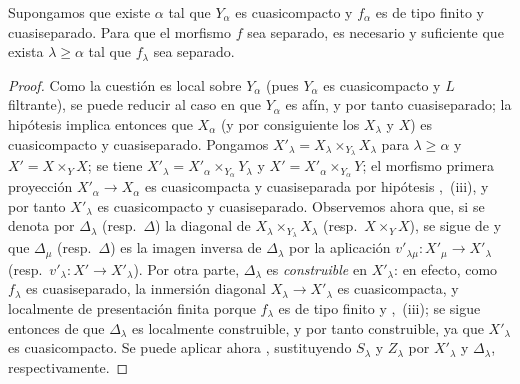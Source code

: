 \begin{proposition}[8.10.4]
\label{IV.8.10.4-fr}
Supongamos que existe $\alpha$ tal que $Y_\alpha$ es cuasicompacto y $f_\alpha$ es de tipo finito y cuasiseparado.
Para que el morfismo $f$ sea separado, es necesario y suficiente que exista $\lambda\geq\alpha$ tal que $f_\lambda$ sea separado.
\end{proposition}

\begin{proof}
Como la cuestión es local sobre $Y_\alpha$ (pues $Y_\alpha$ es cuasicompacto y $L$ filtrante), se puede reducir al caso en que $Y_\alpha$ es afín, y por tanto cuasiseparado; la hipótesis implica entonces que $X_\alpha$ (y por consiguiente los $X_\lambda$ y $X$) es cuasicompacto y cuasiseparado.
Pongamos $X'_\lambda=X_\lambda\times_{Y_\lambda}X_\lambda$ para $\lambda\geq\alpha$ y $X'=X\times_YX$; se tiene $X'_\lambda=X'_\alpha\times_{Y_\alpha}Y_\lambda$ y $X'=X'_\alpha\times_{Y_\alpha}Y$; el morfismo primera proyección $X'_\alpha\to X_\alpha$ es cuasicompacta y cuasiseparada por hipótesis ,~(iii), y por tanto $X'_\lambda$ es cuasicompacto y cuasiseparado.
Observemos ahora que, si se denota por $\Delta_\lambda$ (resp.\ $\Delta$) la diagonal de $X_\lambda\times_{Y_\lambda}X_\lambda$ (resp.\ $X\times_YX$), se sigue de  y  que $\Delta_\mu$ (resp.\ $\Delta$) es la imagen inversa de $\Delta_\lambda$ por la aplicación $v'_{\lambda\mu}:X'_\mu\to X'_\lambda$ (resp.\ $v'_\lambda:X'\to X'_\lambda$).
Por otra parte, $\Delta_\lambda$ es \emph{construible} en $X'_\lambda$: en efecto, como $f_\lambda$ es cuasiseparado, la inmersión diagonal $X_\lambda\to X'_\lambda$ es cuasicompacta, y localmente de presentación finita porque $f_\lambda$ es de tipo finito  y ,~(iii); se sigue entonces de  que $\Delta_\lambda$ es localmente construible, y por tanto construible, ya que $X'_\lambda$ es cuasicompacto.
Se puede aplicar ahora , sustituyendo $S_\lambda$ y $Z_\lambda$ por $X'_\lambda$ y $\Delta_\lambda$, respectivamente.
\end{proof}

